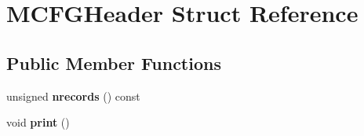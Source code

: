 \hypertarget{struct_m_c_f_g_header}{}\section{M\+C\+F\+G\+Header Struct Reference}
\label{struct_m_c_f_g_header}
\subsection*{Public Member Functions}
\begin{DoxyCompactItemize}
\item 
\mbox{\label{struct_m_c_f_g_header_ae69ced6c5f13fae4af9182ae37e333e7}} 
unsigned {\bfseries nrecords} () const
\item 
\mbox{\label{struct_m_c_f_g_header_a3237441346fd64f80cb8b4b24aaa04cc}} 
void {\bfseries print} ()
\end{DoxyCompactItemize}
